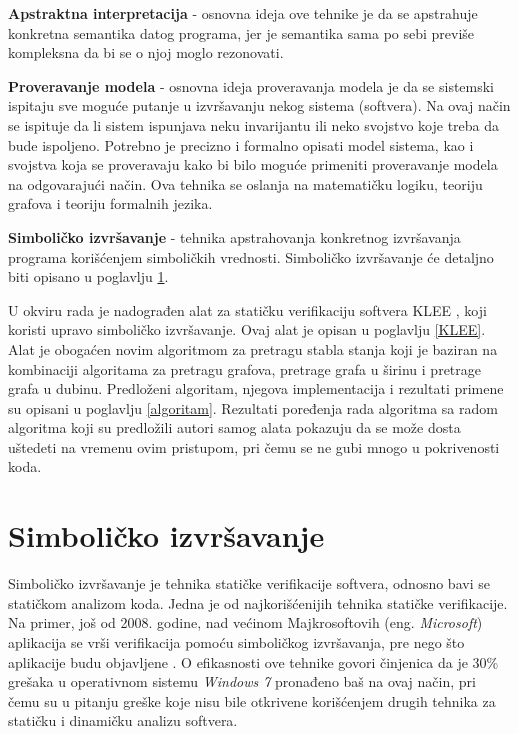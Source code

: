 \documentclass[12pt,oneside]{memoir}
\begin{document}
\begin{description}
    \item \textbf{Apstraktna interpretacija} \cite{abstract_interpretation} - osnovna ideja ove tehnike je da se apstrahuje konkretna semantika datog programa, jer je semantika sama po sebi previše kompleksna da bi se o njoj moglo rezonovati.

    \item \textbf{Proveravanje modela} \cite{model_checking} - osnovna ideja proveravanja modela je da se sistemski ispitaju sve moguće putanje u izvršavanju nekog sistema (softvera). Na ovaj način se ispituje da li sistem ispunjava neku invarijantu ili neko svojstvo koje treba da bude ispoljeno. Potrebno je precizno i formalno opisati model sistema, kao i svojstva koja se proveravaju kako bi bilo moguće primeniti proveravanje modela na odgovarajući način. Ova tehnika se oslanja na matematičku logiku, teoriju grafova i teoriju formalnih jezika.
    
    \item \textbf{Simboličko izvršavanje} - tehnika apstrahovanja konkretnog izvršavanja programa korišćenjem simboličkih vrednosti. Simboličko izvršavanje će detaljno biti opisano u poglavlju \ref{chp:simbolicko_izvrsavanje}.
    
\end{description}

U okviru rada je nadograđen alat za statičku verifikaciju softvera KLEE \cite{klee}, koji koristi upravo simboličko izvršavanje. Ovaj alat je opisan u poglavlju \ref{KLEE}. Alat je obogaćen novim algoritmom za pretragu stabla stanja koji je baziran na kombinaciji algoritama za pretragu grafova, pretrage grafa u širinu i pretrage grafa u dubinu. Predloženi algoritam, njegova implementacija i rezultati primene su 
opisani u poglavlju \ref{algoritam}. Rezultati poređenja rada algoritma sa radom algoritma koji su predložili autori samog alata pokazuju da se može dosta uštedeti na vremenu ovim pristupom, pri čemu se ne gubi mnogo u pokrivenosti koda.

\chapter{Simboličko izvršavanje} \label{chp:simbolicko_izvrsavanje}

\indent Simboličko izvršavanje je tehnika statičke verifikacije softvera, odnosno bavi se statičkom analizom koda. Jedna je od najkorišćenijih tehnika statičke verifikacije. Na primer, još od 2008. godine, nad većinom Majkrosoftovih (eng. \textit{Microsoft}) aplikacija se vrši verifikacija pomoću simboličkog izvršavanja, pre nego što aplikacije budu objavljene \cite{microsoft}. O efikasnosti ove tehnike govori činjenica da je 30\% grešaka u operativnom sistemu \textit{Windows 7} pronađeno baš na ovaj način, pri čemu su u pitanju greške koje nisu bile otkrivene korišćenjem drugih tehnika za statičku i dinamičku analizu softvera.
\end{document}
